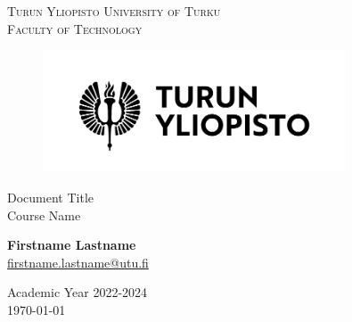\documentclass[12pt]{report}
\makeatletter
\newcommand{\faculty}{Faculty of Technology}
\newcommand{\course}{Course Name}
\newcommand{\academicyear}{2022-2024}
\newcommand{\documenttitle}{Document Title}
\newcommand{\authorname}{Firstname Lastname}
\newcommand{\authoremail}{firstname.lastname@utu.fi}
\makeatother
\begin{document}
	\begin{titlepage}
		\begin{center}
			\textsc{Turun Yliopisto \textemdash \hspace{1mm} University of Turku} \\
			\textsc{\faculty}
		\end{center}
		\begin{figure}[h]
			\vspace{10mm}
			
			\centering\includegraphics[width=0.8\textwidth]{logo-fi.pdf}

			\vspace{20mm}
		\end{figure}
		\begin{center}
			\fontsize{10mm}{7mm}\selectfont
			\textup{\documenttitle} \\
			\textnormal{ \Large{\course}} \\

			\vspace{30mm}

			\large{\textbf{\authorname}} \\
			\large{\href{mailto:\authoremail}{\authoremail}} \\
			
			\vspace{35mm}
			
			\large{Academic Year \academicyear} \\
			\today
		\end{center}
	\end{titlepage}
\end{document}
